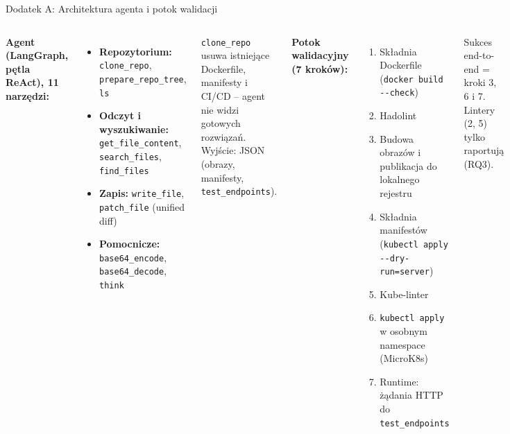 \documentclass[aspectratio=169]{beamer}
\begin{document}
\begin{frame}{Dodatek A: Architektura agenta i potok walidacji}
    \begin{columns}[T]
        \textbf{Agent (LangGraph, pętla ReAct), 11 narzędzi:}
        {\footnotesize
        \begin{itemize}
            \item \textbf{Repozytorium:} \texttt{clone\_repo}, \texttt{prepare\_repo\_tree}, \texttt{ls}
            \item \textbf{Odczyt i wyszukiwanie:} \texttt{get\_file\_content}, \texttt{search\_files}, \texttt{find\_files}
            \item \textbf{Zapis:} \texttt{write\_file}, \texttt{patch\_file} (unified diff)
            \item \textbf{Pomocnicze:} \texttt{base64\_encode}, \texttt{base64\_decode}, \texttt{think}
        \end{itemize}
        \vspace{0.3em}
        \texttt{clone\_repo} usuwa istniejące Dockerfile, manifesty i CI/CD -- agent nie widzi gotowych rozwiązań. Wyjście: JSON (obrazy, manifesty, \texttt{test\_endpoints}).}
        \textbf{Potok walidacyjny (7 kroków):}
        {\footnotesize
        \begin{enumerate}
            \item Składnia Dockerfile (\texttt{docker build -{}-check})
            \item Hadolint
            \item Budowa obrazów i publikacja do lokalnego rejestru
            \item Składnia manifestów (\texttt{kubectl apply -{}-dry-run=server})
            \item Kube-linter
            \item \texttt{kubectl apply} w osobnym namespace (MicroK8s)
            \item Runtime: żądania HTTP do \texttt{test\_endpoints}
        \end{enumerate}
        \vspace{0.3em}
        Sukces end-to-end = kroki 3, 6 i 7. Lintery (2, 5) tylko raportują (RQ3).}
    \end{columns}
\end{frame}
\end{document}
